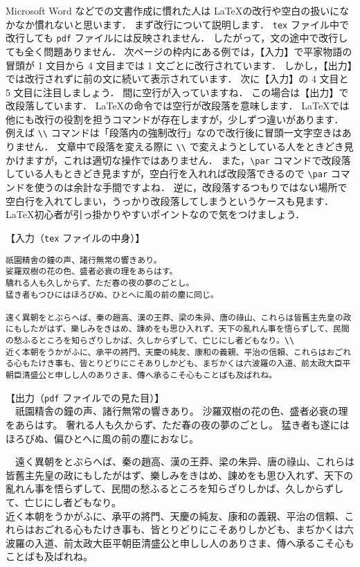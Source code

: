 Microsoft Word などでの文書作成に慣れた人は \LaTeX の改行や空白の扱いになかなか慣れないと思います．
まず改行について説明します．
\verb|tex| ファイル中で改行しても \verb|pdf| ファイルには反映されません．
したがって，文の途中で改行しても全く問題ありません．
次ページの枠内にある例では，【入力】で平家物語の冒頭が 1 文目から 4 文目までは 1 文ごとに改行されています．
しかし，【出力】では改行されずに前の文に続いて表示されています．
次に【入力】の 4 文目と 5 文目に注目しましょう．
間に空行が入っていますね．
この場合は【出力】で改段落しています．
\LaTeX の命令では空行が改段落を意味します．
\LaTeX では他にも改行の役割を担うコマンドが存在しますが，少しずつ違いがあります．
例えば \verb|\\| コマンドは「段落内の強制改行」なので改行後に冒頭一文字空きはありません．
文章中で段落を変える際に \verb|\\| で変えようとしている人をときどき見かけますが，これは適切な操作ではありません．
また，\verb|\par| コマンドで改段落している人もときどき見ますが，空白行を入れれば改段落できるので \verb|\par| コマンドを使うのは余計な手間ですよね．
逆に，改段落するつもりではない場所で空白行を入れてしまい，うっかり改段落してしまうというケースも見ます．
\LaTeX 初心者が引っ掛かりやすいポイントなので気をつけましょう．

\begin{tcolorbox}[title=改行・改段落]
【入力（\verb|tex| ファイルの中身）】
\begin{verbatim}
祇園精舍の鐘の声、諸行無常の響きあり。
娑羅双樹の花の色、盛者必衰の理をあらはす。
驕れる人も久しからず、ただ春の夜の夢のごとし。
猛き者もつひにはほろびぬ、ひとへに風の前の塵に同じ。

遠く異朝をとぶらへば、秦の趙高、漢の王莽、梁の朱异、唐の祿山、これらは皆舊主先皇の政にもしたがはず、樂しみをきはめ、諌めをも思ひ入れず、天下の亂れん事を悟らずして、民間の愁ふるところを知らざりしかば、久しからずして、亡じにし者どもなり。\\
近く本朝をうかがふに、承平の將門、天慶の純友、康和の義親、平治の信賴、これらはおごれる心もたけき事も、皆とりどりにこそありしかども、まぢかくは六波羅の入道、前太政大臣平朝臣清盛公と申しし人のありさま、傳へ承るこそ心もことばも及ばれね。
\end{verbatim}
\tcblower
【出力（\verb|pdf| ファイルでの見た目）】\\
　祇園精舎の鐘の声、諸行無常の響きあり。
沙羅双樹の花の色、盛者必衰の理をあらはす。
奢れる人も久からず、ただ春の夜の夢のごとし。
猛き者も遂にはほろびぬ、偏ひとへに風の前の塵におなじ。

　遠く異朝をとぶらへば、秦の趙高、漢の王莽、梁の朱异、唐の祿山、これらは皆舊主先皇の政にもしたがはず、樂しみをきはめ、諌めをも思ひ入れず、天下の亂れん事を悟らずして、民間の愁ふるところを知らざりしかば、久しからずして、亡じにし者どもなり。\\
近く本朝をうかがふに、承平の將門、天慶の純友、康和の義親、平治の信賴、これらはおごれる心もたけき事も、皆とりどりにこそありしかども、まぢかくは六波羅の入道、前太政大臣平朝臣清盛公と申しし人のありさま、傳へ承るこそ心もことばも及ばれね。
\end{tcolorbox}

